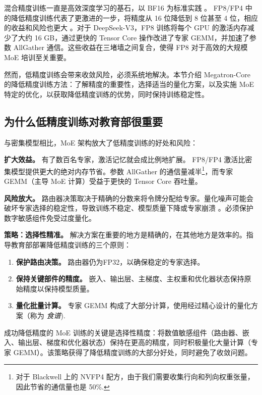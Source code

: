 混合精度训练一直是高效深度学习的基石，以 BF16 为标准实践 \cite{micikevicius2018mixed,peng2023fp8lmtrainingfp8large,xi2024coat}。 FP8/FP4 中的降低精度训练代表了更激进的一步，将精度从 16 位降低到 8 位甚至 4 位，相应的收益和风险也更大 \cite{micikevicius2022fp8formatsdeeplearning,fishman2025scalingfp8trainingtrilliontoken}。对于 DeepSeek-V3，FP8 训练将每个 GPU 的激活内存减少了大约 16 GB，通过更快的 Tensor Core 操作改进了专家 GEMM，并加速了参数 AllGather 通信。这些收益在三堵墙之间复合，使得 FP8 对于高效的大规模 MoE 培训至关重要。

然而，低精度训练会带来收敛风险，必须系统地解决。本节介绍 Megatron-Core 的降低精度训练方法：了解精度的重要性，选择适当的量化方案，以及实施 MoE 特定的优化，以获取降低精度训练的优势，同时保持训练稳定性。

\subsection{为什么低精度训练对教育部很重要}\label{sec:precision-anatomy}

与密集模型相比，MoE 架构放大了低精度训练的好处和风险：

\textbf{扩大效益。} 有了数百名专家，激活记忆就会成比例地扩展。 FP8/FP4 激活比密集模型提供更大的绝对内存节省。参数 AllGather 的通信量减半\footnote{对于 Blackwell 上的 NVFP4 配方，由于我们需要收集行向和列向权重张量，因此节省的通信量也是 50\%.}，而专家 GEMM（主导 MoE 计算）受益于更快的 Tensor Core 吞吐量。

\textbf{风险放大。} 路由器决策取决于精确的分数来将令牌分配给专家。量化噪声可能会破坏专家选择的稳定性，导致训练不稳定、模型质量下降或专家崩溃 \cite{nagel2021whitepaper}。必须保护数字敏感组件免受过度量化。

\textbf{策略：选择性精准。} 解决方案在重要的地方是精确的，在其他地方是效率的。指导教育部部署降低精度训练的三个原则：
\begin{enumerate}
    \item \textbf{保护路由决策。} 路由器仍为FP32，以确保稳定的专家选择。
    \item \textbf{保持关键部件的精度。} 嵌入、输出层、主梯度、主权重和优化器状态保持原始精度以保持模型质量。
    \item \textbf{量化批量计算。} 专家 GEMM 构成了大部分计算，使用经过精心设计的量化方案（称为 \textit{食谱}).
\end{enumerate}

\begin{notebox}
成功降低精度的 MoE 训练的关键是选择性精度：将数值敏感组件（路由器、嵌入、输出层、梯度和优化器状态）保持在更高的精度，同时积极量化大量计算（专家 GEMM）。该策略获得了降低精度训练的大部分好处，同时避免了收敛问题。
\end{notebox}

